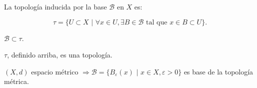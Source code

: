 \begin{definition}
	La topología inducida por la base $\mathcal{B}$ en $X$ es:

	\[
	\tau = \{ U \subset X \text{ | } \forall x \in U, \exists B \in \mathcal{B} \text{ tal que } x \in B \subset U \}.
	\]
\end{definition}

\begin{note}
	$\mathcal{B} \subset \tau$.
\end{note}

\begin{lemma}
	$\tau$, definido arriba, es una topología.
\end{lemma}

\begin{eg}
	$(X,d)$ espacio métrico $\Rightarrow \mathcal{B} = \{ B_{\varepsilon} (x) \text{ | } x \in X, \varepsilon > 0 \}$ es base de la topología métrica.
\end{eg}
